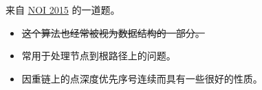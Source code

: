 \noindent 来自 \href{https://www.luogu.com.cn/problem/P2146}{NOI 2015} 的一道题。

\begin{itemize}
    \item \sout{这个算法也经常被视为数据结构的一部分。}
    \item 常用于处理节点到根路径上的问题。
    \item 因重链上的点深度优先序号连续而具有一些很好的性质。
\end{itemize}